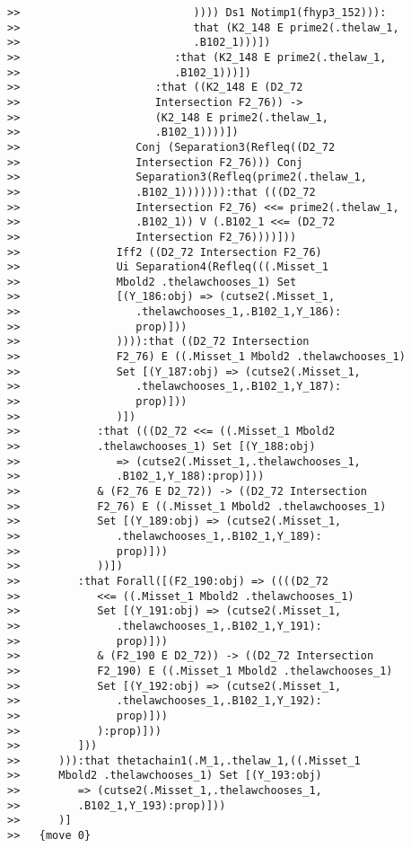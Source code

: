 \documentclass[12pt]{article}
\begin{document}
\begin{verbatim}
>>                           )))) Ds1 Notimp1(fhyp3_152))):
>>                           that (K2_148 E prime2(.thelaw_1,
>>                           .B102_1)))])
>>                        :that (K2_148 E prime2(.thelaw_1,
>>                        .B102_1)))])
>>                     :that ((K2_148 E (D2_72
>>                     Intersection F2_76)) ->
>>                     (K2_148 E prime2(.thelaw_1,
>>                     .B102_1))))])
>>                  Conj (Separation3(Refleq((D2_72
>>                  Intersection F2_76))) Conj
>>                  Separation3(Refleq(prime2(.thelaw_1,
>>                  .B102_1))))))):that (((D2_72
>>                  Intersection F2_76) <<= prime2(.thelaw_1,
>>                  .B102_1)) V (.B102_1 <<= (D2_72
>>                  Intersection F2_76))))]))
>>               Iff2 ((D2_72 Intersection F2_76)
>>               Ui Separation4(Refleq(((.Misset_1
>>               Mbold2 .thelawchooses_1) Set
>>               [(Y_186:obj) => (cutse2(.Misset_1,
>>                  .thelawchooses_1,.B102_1,Y_186):
>>                  prop)]))
>>               )))):that ((D2_72 Intersection
>>               F2_76) E ((.Misset_1 Mbold2 .thelawchooses_1)
>>               Set [(Y_187:obj) => (cutse2(.Misset_1,
>>                  .thelawchooses_1,.B102_1,Y_187):
>>                  prop)]))
>>               )])
>>            :that (((D2_72 <<= ((.Misset_1 Mbold2
>>            .thelawchooses_1) Set [(Y_188:obj)
>>               => (cutse2(.Misset_1,.thelawchooses_1,
>>               .B102_1,Y_188):prop)]))
>>            & (F2_76 E D2_72)) -> ((D2_72 Intersection
>>            F2_76) E ((.Misset_1 Mbold2 .thelawchooses_1)
>>            Set [(Y_189:obj) => (cutse2(.Misset_1,
>>               .thelawchooses_1,.B102_1,Y_189):
>>               prop)]))
>>            ))])
>>         :that Forall([(F2_190:obj) => ((((D2_72
>>            <<= ((.Misset_1 Mbold2 .thelawchooses_1)
>>            Set [(Y_191:obj) => (cutse2(.Misset_1,
>>               .thelawchooses_1,.B102_1,Y_191):
>>               prop)]))
>>            & (F2_190 E D2_72)) -> ((D2_72 Intersection
>>            F2_190) E ((.Misset_1 Mbold2 .thelawchooses_1)
>>            Set [(Y_192:obj) => (cutse2(.Misset_1,
>>               .thelawchooses_1,.B102_1,Y_192):
>>               prop)]))
>>            ):prop)]))
>>         ]))
>>      ))):that thetachain1(.M_1,.thelaw_1,((.Misset_1
>>      Mbold2 .thelawchooses_1) Set [(Y_193:obj)
>>         => (cutse2(.Misset_1,.thelawchooses_1,
>>         .B102_1,Y_193):prop)]))
>>      )]
>>   {move 0}



\end{verbatim}
\end{document}

